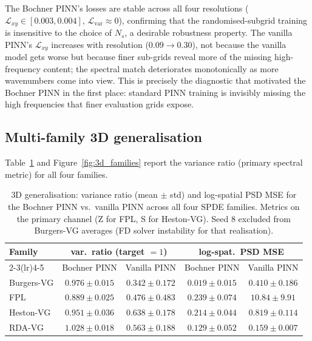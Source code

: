\documentclass[review,12pt]{elsarticle}
\begin{document}
The Bochner PINN's losses are stable across all four resolutions
(\(\mathcal{L}_{xy} \in [0.003, 0.004]\),
\(\mathcal{L}_{\mathrm{var}} \approx 0\)), confirming that the
randomised-subgrid training is insensitive to the choice of \(N_s\),
a desirable robustness property. The vanilla PINN's
\(\mathcal{L}_{xy}\) increases with resolution (\(0.09 \to 0.30\)),
not because the vanilla model gets worse but because finer sub-grids
reveal more of the missing high-frequency content; the spectral
match deteriorates monotonically as more wavenumbers come into view.
This is precisely the diagnostic that motivated the Bochner PINN in
the first place: standard PINN training is invisibly missing the
high frequencies that finer evaluation grids expose.

\subsection{Multi-family 3D generalisation}
\label{subsec:3d-multifamily}

Table~\ref{tab:3d-multifamily} and Figure~\ref{fig:3d_families} report
the variance ratio (primary spectral metric) for all four families.

\begin{table}[h]
\centering
\caption{3D generalisation: variance ratio (mean \(\pm\) std) and
log-spatial PSD MSE for the Bochner PINN vs.\ vanilla PINN across all
four SPDE families. Metrics on the primary channel (Z for FPL, S for
Heston-VG). Seed 8 excluded from Burgers-VG averages (FD solver
instability for that realisation).}
\label{tab:3d-multifamily}
\begin{tabular}{l c c c c}
\toprule
Family & \multicolumn{2}{c}{var.\ ratio (target \(= 1\))} &
         \multicolumn{2}{c}{log-spat.\ PSD MSE} \\
\cmidrule(lr){2-3}\cmidrule(lr){4-5}
       & Bochner PINN & Vanilla PINN & Bochner PINN & Vanilla PINN \\
\midrule
Burgers-VG  & \(\mathbf{0.976 \pm 0.015}\) & \(0.342 \pm 0.172\) &
              \(\mathbf{0.019 \pm 0.015}\) & \(0.410 \pm 0.186\) \\
FPL         & \(\mathbf{0.889 \pm 0.025}\) & \(0.476 \pm 0.483\) &
              \(\mathbf{0.239 \pm 0.074}\) & \(10.84 \pm 9.91\) \\
Heston-VG   & \(\mathbf{0.951 \pm 0.036}\) & \(0.638 \pm 0.178\) &
              \(\mathbf{0.214 \pm 0.044}\) & \(0.819 \pm 0.114\) \\
RDA-VG      & \(\mathbf{1.028 \pm 0.018}\) & \(0.563 \pm 0.188\) &
              \(\mathbf{0.129 \pm 0.052}\) & \(0.159 \pm 0.007\) \\
\bottomrule
\end{tabular}
\end{table}
\end{document}

